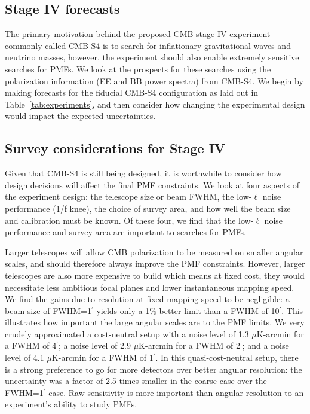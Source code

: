 \documentclass[apj]{emulateapj}
\newcommand{\ukarcmin}{\ensuremath{\mu}K-arcmin}
\begin{document}
\subsection{Stage IV forecasts}

The primary motivation behind the proposed CMB stage IV experiment commonly called CMB-S4 is to search for inflationary gravitational waves and neutrino masses, however, the experiment should also enable extremely sensitive searches for PMFs. 
We look at the prospects for these searches using the polarization information (EE and BB power spectra) from CMB-S4. 
We begin by making forecasts for the fiducial CMB-S4 configuration as laid out in Table~\ref{tab:experiments}, and then consider how changing the experimental design would impact the expected uncertainties. 




\subsection{Survey considerations for Stage IV}

Given that CMB-S4 is still being designed, it is worthwhile to consider how design decisions will affect the final PMF constraints. 
We look at four aspects of the experiment design: the telescope size or beam FWHM, the low-$\ell$ noise performance (1/f knee),  the choice of survey area, and how well the beam size and calibration must be known. 
Of these four, we find that the low-$\ell$ noise performance and survey area are important to searches for PMFs.

Larger telescopes will allow CMB polarization to be measured on smaller angular scales, and should therefore always improve the PMF constraints. 
However, larger telescopes are also more expensive to build which means at fixed cost, they would necessitate less ambitious focal planes and lower instantaneous mapping speed. 
We find the gains due to resolution at fixed mapping speed to be negligible: a beam size of FWHM=1$^\prime$ yields only a 1\% better limit than a FWHM of 10$^\prime$. 
This illustrates how important the large angular scales are to the PMF limits. 
We very crudely approximated a cost-neutral setup with a noise level of 1.3 \ukarcmin{} for a FWHM of 4$^\prime$; a noise level of 2.9 \ukarcmin{} for a FWHM of 2$^\prime$; and a noise level of 4.1 \ukarcmin{} for a FWHM of 1$^\prime$. 
In this quasi-cost-neutral setup, there is a strong preference to go for more detectors over better angular resolution: the uncertainty was a factor of 2.5 times smaller in the coarse case over the FWHM=1$^\prime$ case. 
Raw sensitivity is more important than angular resolution to an experiment's ability to study PMFs.
\end{document}
